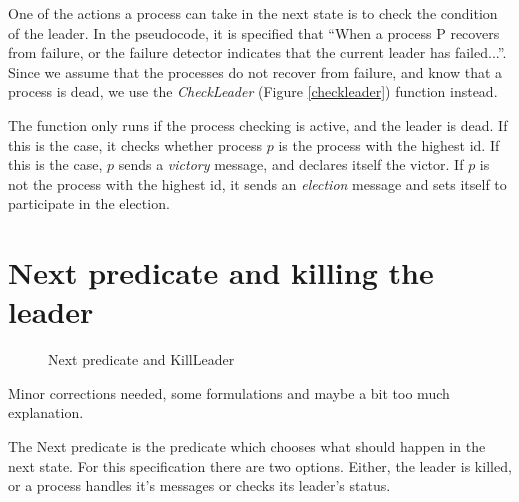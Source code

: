 \documentclass{report}
\begin{document}
\begin{calloutgreen}
\begin{calloutyellow}
One of the actions a process can take in the next state is to check the condition of the leader.
In the pseudocode, it is specified that ``When a process P recovers from failure, or the failure detector indicates that the current leader has failed...''. Since we assume that the processes do not recover from failure, and know that a process is dead, we use the \textit{CheckLeader} (Figure \ref{checkleader}) function instead.

The function only runs if the process checking is active, and the leader is dead. If this is the case, it checks whether process $p$ is the process with the highest id. If this is the case, $p$ sends a \textit{victory} message, and declares itself the victor. If $p$ is not the process with the highest id, it sends an \textit{election} message and sets itself to participate in the election.



\section{Next predicate and killing the leader}
\begin{figure}

\tlatex
\@x{}\moduleLeftDash{}\moduleRightDash\@xx{}%

%
%
%
\@pvspace{8.0pt}%
%

\fl{}\bottombar\cl{}
\caption{Next predicate and KillLeader}
\label{nextpredkillleader}
\end{figure}

\begin{calloutgreen}
  Minor corrections needed, some formulations and maybe a bit too much explanation.
  \end{calloutgreen}

The Next predicate is the predicate which chooses what should happen in the next state.
For this specification there are two options. Either, the leader is killed, or a process handles it's messages or checks its leader's status.


\end{calloutyellow}
\end{calloutgreen}
\end{document}
